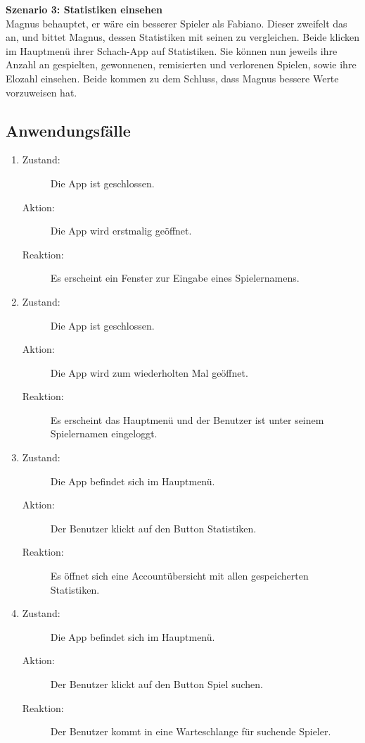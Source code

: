 \documentclass[parskip=full]{scrartcl}
\begin{document}
\textbf{Szenario 3: \glqq Statistiken einsehen\grqq} \\
Magnus behauptet, er wäre ein besserer Spieler als Fabiano. Dieser zweifelt das an, und bittet Magnus, dessen Statistiken mit seinen zu vergleichen. Beide klicken im Hauptmenü ihrer Schach-App auf \glqq Statistiken\grqq. Sie können nun jeweils ihre Anzahl an gespielten, gewonnenen, remisierten und verlorenen Spielen, sowie ihre \gls{Elo}zahl einsehen. Beide kommen zu dem Schluss, dass Magnus bessere Werte vorzuweisen hat.

\subsection{Anwendungsfälle}
\begin{enumerate}
 
    \item
	\begin{description}
	\item[Zustand:] Die App ist geschlossen.
	\item[Aktion:] Die App wird erstmalig geöffnet.
	\item[Reaktion:] Es erscheint ein Fenster zur Eingabe eines Spielernamens.  \\	
	\end{description}
	
	\item
	\begin{description}
	\item[Zustand:] Die App ist geschlossen.
	\item[Aktion:] Die App wird zum wiederholten Mal geöffnet.
	\item[Reaktion:] Es erscheint das Hauptmenü und der Benutzer ist unter seinem Spielernamen eingeloggt. \\
	\end{description}
	
	\item
	\begin{description}
	\item[Zustand:] Die App befindet sich im Hauptmenü.
	\item[Aktion:] Der Benutzer klickt auf den Button \glqq Statistiken\grqq.
	\item[Reaktion:] Es öffnet sich eine Accountübersicht mit allen gespeicherten Statistiken.  \\
	\end{description}
	
	\item
	\begin{description}
	\item[Zustand:] Die App befindet sich im Hauptmenü.
	\item[Aktion:] Der Benutzer klickt auf den Button \glqq Spiel suchen\grqq.
	\item[Reaktion:] Der Benutzer kommt in eine Warteschlange für suchende Spieler.  \\
	\end{description}
	

\end{enumerate}
\end{document}
